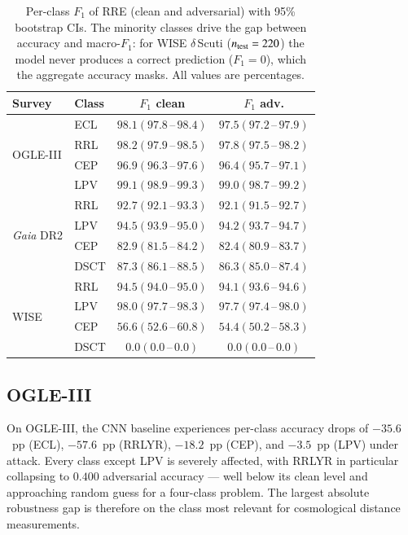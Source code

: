 \documentclass{aa}
\begin{document}
\begin{table}[htbp]\centering
\caption{Per-class $F_1$ of RRE (clean and adversarial) with 95\% bootstrap CIs. The minority classes drive the gap between accuracy and macro-$F_1$: for WISE $\delta$\,Scuti ($n_{\rm test}=220$) the model never produces a correct prediction ($F_1=0$), which the aggregate accuracy masks. All values are percentages.}
\label{tab:perclass_f1}
\small
\begin{tabular}{llcc}
\toprule
Survey & Class & $F_1$ clean & $F_1$ adv.\\
\midrule
\multirow{4}{*}{OGLE-III} & ECL & $98.1 (97.8\,\text{--}\,98.4)$ & $97.5 (97.2\,\text{--}\,97.9)$\\
 & RRL & $98.2 (97.9\,\text{--}\,98.5)$ & $97.8 (97.5\,\text{--}\,98.2)$\\
 & CEP & $96.9 (96.3\,\text{--}\,97.6)$ & $96.4 (95.7\,\text{--}\,97.1)$\\
 & LPV & $99.1 (98.9\,\text{--}\,99.3)$ & $99.0 (98.7\,\text{--}\,99.2)$\\
\midrule
\multirow{4}{*}{\textit{Gaia} DR2} & RRL & $92.7 (92.1\,\text{--}\,93.3)$ & $92.1 (91.5\,\text{--}\,92.7)$\\
 & LPV & $94.5 (93.9\,\text{--}\,95.0)$ & $94.2 (93.7\,\text{--}\,94.7)$\\
 & CEP & $82.9 (81.5\,\text{--}\,84.2)$ & $82.4 (80.9\,\text{--}\,83.7)$\\
 & DSCT & $87.3 (86.1\,\text{--}\,88.5)$ & $86.3 (85.0\,\text{--}\,87.4)$\\
\midrule
\multirow{4}{*}{WISE} & RRL & $94.5 (94.0\,\text{--}\,95.0)$ & $94.1 (93.6\,\text{--}\,94.6)$\\
 & LPV & $98.0 (97.7\,\text{--}\,98.3)$ & $97.7 (97.4\,\text{--}\,98.0)$\\
 & CEP & $56.6 (52.6\,\text{--}\,60.8)$ & $54.4 (50.2\,\text{--}\,58.3)$\\
 & DSCT & $0.0 (0.0\,\text{--}\,0.0)$ & $0.0 (0.0\,\text{--}\,0.0)$\\
\bottomrule
\end{tabular}
\end{table}

\subsection{OGLE-III}

On OGLE-III, the CNN baseline experiences per-class accuracy drops of
$-35.6$~pp (ECL), $-57.6$~pp (RRLYR), $-18.2$~pp (CEP), and $-3.5$~pp
(LPV) under attack. Every class except LPV is severely affected, with
RRLYR in
particular collapsing to $0.400$ adversarial accuracy --- well below its
clean level and approaching random guess for a four-class problem. The
largest absolute
robustness gap is therefore on the class most relevant for cosmological
distance measurements.
\end{document}
